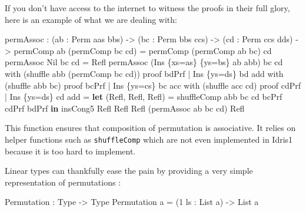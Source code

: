 \documentclass[
]{article}
\newenvironment{Shaded}{}{}
\newcommand{\DataTypeTok}[1]{\textcolor[rgb]{0.56,0.13,0.00}{#1}}
\newcommand{\DecValTok}[1]{\textcolor[rgb]{0.25,0.63,0.44}{#1}}
\newcommand{\KeywordTok}[1]{\textcolor[rgb]{0.00,0.44,0.13}{\textbf{#1}}}
\newcommand{\NormalTok}[1]{#1}
\newcommand{\OperatorTok}[1]{\textcolor[rgb]{0.40,0.40,0.40}{#1}}
\newcommand{\OtherTok}[1]{\textcolor[rgb]{0.00,0.44,0.13}{#1}}
\begin{document}
If you don't have access to the internet to witness the proofs in their
full glory, here is an example of what we are dealing with:

\begin{Shaded}
\begin{Highlighting}[]
\NormalTok{permAssoc }\OperatorTok{:}\NormalTok{ (ab }\OperatorTok{:} \DataTypeTok{Perm}\NormalTok{ aas bbs) }\OtherTok{{-}\textgreater{}}\NormalTok{ (bc }\OperatorTok{:} \DataTypeTok{Perm}\NormalTok{ bbs ccs) }
         \OtherTok{{-}\textgreater{}}\NormalTok{ (cd }\OperatorTok{:} \DataTypeTok{Perm}\NormalTok{ ccs dds)}
         \OtherTok{{-}\textgreater{}}\NormalTok{ permComp ab (permComp bc cd) }\OtherTok{=}\NormalTok{ permComp (permComp ab bc) cd}
\NormalTok{permAssoc }\DataTypeTok{Nil}\NormalTok{ bc cd }\OtherTok{=} \DataTypeTok{Refl}
\NormalTok{permAssoc (}\DataTypeTok{Ins}\NormalTok{ \{xs}\OtherTok{=}\NormalTok{as\} \{ys}\OtherTok{=}\NormalTok{bs\} ab\textquotesingle{} abb) bc cd }
\NormalTok{  with (shuffle abb (permComp bc cd)) proof bdPrf}
  \OperatorTok{|} \DataTypeTok{Ins}\NormalTok{ \{ys}\OtherTok{=}\NormalTok{ds\} bd\textquotesingle{} add with (shuffle abb bc) proof bcPrf}
    \OperatorTok{|} \DataTypeTok{Ins}\NormalTok{ \{ys}\OtherTok{=}\NormalTok{cs\} bc\textquotesingle{} acc with (shuffle acc cd) proof cdPrf}
      \OperatorTok{|} \DataTypeTok{Ins}\NormalTok{ \{ys}\OtherTok{=}\NormalTok{ds\textquotesingle{}\} cd\textquotesingle{} ad\textquotesingle{}d }\OtherTok{=}
        \KeywordTok{let}\NormalTok{ (}\DataTypeTok{Refl}\NormalTok{, }\DataTypeTok{Refl}\NormalTok{, }\DataTypeTok{Refl}\NormalTok{) }\OtherTok{=}\NormalTok{ shuffleComp abb bc cd bcPrf cdPrf bdPrf}
         \KeywordTok{in}\NormalTok{ insCong5 }\DataTypeTok{Refl} \DataTypeTok{Refl} \DataTypeTok{Refl}\NormalTok{ (permAssoc ab\textquotesingle{} bc\textquotesingle{} cd\textquotesingle{}) }\DataTypeTok{Refl}
\end{Highlighting}
\end{Shaded}

This function ensures that composition of permutation is associative. It
relies on helper functions such as \texttt{shuffleComp} which are not
even implemented in Idris1 because it is too hard to implement.

Linear types can thankfully ease the pain by providing a very simple
representation of permutations :

\begin{Shaded}
\begin{Highlighting}[]
\DataTypeTok{Permutation} \OperatorTok{:} \DataTypeTok{Type} \OtherTok{{-}\textgreater{}} \DataTypeTok{Type}
\DataTypeTok{Permutation}\NormalTok{ a }\OtherTok{=}\NormalTok{ (}\DecValTok{1}\NormalTok{ ls }\OperatorTok{:} \DataTypeTok{List}\NormalTok{ a) }\OtherTok{{-}\textgreater{}} \DataTypeTok{List}\NormalTok{ a}
\end{Highlighting}
\end{Shaded}
\end{document}
